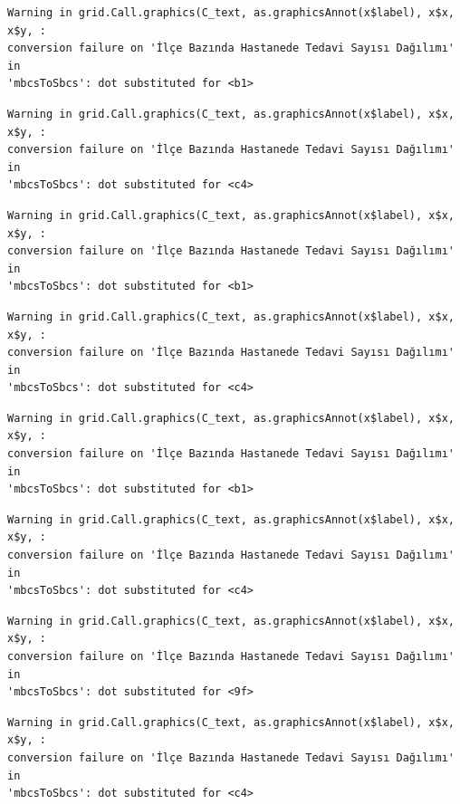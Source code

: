 \documentclass[
  11pt,
  a4paper,
  DIV=11,
  numbers=noendperiod]{scrartcl}
\begin{document}
\begin{verbatim}
Warning in grid.Call.graphics(C_text, as.graphicsAnnot(x$label), x$x, x$y, :
conversion failure on 'İlçe Bazında Hastanede Tedavi Sayısı Dağılımı' in
'mbcsToSbcs': dot substituted for <b1>
\end{verbatim}

\begin{verbatim}
Warning in grid.Call.graphics(C_text, as.graphicsAnnot(x$label), x$x, x$y, :
conversion failure on 'İlçe Bazında Hastanede Tedavi Sayısı Dağılımı' in
'mbcsToSbcs': dot substituted for <c4>
\end{verbatim}

\begin{verbatim}
Warning in grid.Call.graphics(C_text, as.graphicsAnnot(x$label), x$x, x$y, :
conversion failure on 'İlçe Bazında Hastanede Tedavi Sayısı Dağılımı' in
'mbcsToSbcs': dot substituted for <b1>
\end{verbatim}

\begin{verbatim}
Warning in grid.Call.graphics(C_text, as.graphicsAnnot(x$label), x$x, x$y, :
conversion failure on 'İlçe Bazında Hastanede Tedavi Sayısı Dağılımı' in
'mbcsToSbcs': dot substituted for <c4>
\end{verbatim}

\begin{verbatim}
Warning in grid.Call.graphics(C_text, as.graphicsAnnot(x$label), x$x, x$y, :
conversion failure on 'İlçe Bazında Hastanede Tedavi Sayısı Dağılımı' in
'mbcsToSbcs': dot substituted for <b1>
\end{verbatim}

\begin{verbatim}
Warning in grid.Call.graphics(C_text, as.graphicsAnnot(x$label), x$x, x$y, :
conversion failure on 'İlçe Bazında Hastanede Tedavi Sayısı Dağılımı' in
'mbcsToSbcs': dot substituted for <c4>
\end{verbatim}

\begin{verbatim}
Warning in grid.Call.graphics(C_text, as.graphicsAnnot(x$label), x$x, x$y, :
conversion failure on 'İlçe Bazında Hastanede Tedavi Sayısı Dağılımı' in
'mbcsToSbcs': dot substituted for <9f>
\end{verbatim}

\begin{verbatim}
Warning in grid.Call.graphics(C_text, as.graphicsAnnot(x$label), x$x, x$y, :
conversion failure on 'İlçe Bazında Hastanede Tedavi Sayısı Dağılımı' in
'mbcsToSbcs': dot substituted for <c4>
\end{verbatim}
\end{document}
